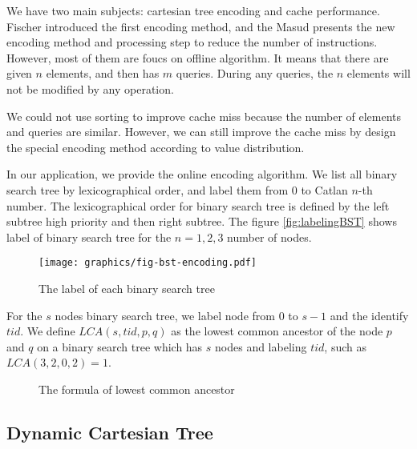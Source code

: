 We have two main subjects: cartesian tree encoding and cache
performance.   Fischer introduced the first encoding method, and the
Masud presents the new encoding method and processing step to reduce
the number of instructions. However, most of them are foucs on offline
algorithm. It means that there are given $n$ elements, and then has
$m$ queries. During any queries, the $n$ elements will not be modified
by any operation.

We could not use sorting to improve cache miss because the number of
elements and queries are similar. However, we can still improve the
cache miss by design the special encoding method according to value
distribution.

In our application, we provide the online encoding algorithm. We list
all binary search tree by lexicographical order, and label them from
$0$ to Catlan $n$-th number. The lexicographical order for binary
search tree is defined by the left subtree high priority and then
right subtree. The figure \ref{fig:labelingBST} shows label of binary
search tree for the $n=1,2,3$ number of nodes.

\begin{figure}[!thb]
  \centering
  \texttt{[image: graphics/fig-bst-encoding.pdf]}
  \caption{The label of each binary search tree}
  \label{fig:lablingBST}
\end{figure}

For the $s$ nodes binary search tree, we label node from $0$ to $s-1$
and the identify $\textit{tid}$.  We define $\mathit{LCA}(s,
\mathit{tid}, p, q)$ as the lowest common ancestor of the node $p$ and
$q$ on a binary search tree which has $s$ nodes and labeling
$\mathit{tid}$, such as $\mathit{LCA}(3, 2, 0, 2) = 1$.

\begin{figure*}[!thb]
  
  \caption{The formula of lowest common ancestor}
  \label{fun:LCA}
\end{figure*}

\subsection{Dynamic Cartesian Tree}